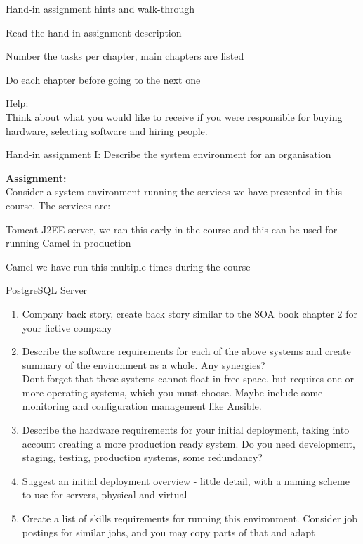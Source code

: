 \documentclass[Screen16to9,17pt]{foils}
\begin{document}


Hand-in assignment hints and walk-through

\begin{list2}
  \item Read the hand-in assignment description
  \item Number the tasks per chapter, main chapters are listed
  \item Do each chapter before going to the next one
\end{list2}

Help:\\
Think about what you would like to receive if you were responsible for buying hardware, selecting software and hiring people.



Hand-in assignment I: Describe the system environment for an organisation

{\bf Assignment:}\\
Consider a system environment running the services we have presented in this course. The services are:

\begin{list2}
\item Tomcat J2EE server, we ran this early in the course and this can be used for running Camel in production
\item Camel we have run this multiple times during the course
\item PostgreSQL Server
\end{list2}


\begin{enumerate}
\item Company back story, create back story similar to the SOA book chapter 2 for your fictive company
\item Describe the software requirements for each of the above systems and create summary of the environment as a whole. Any synergies?\\
Dont forget that these systems cannot float in free space, but requires one or more operating systems, which you must choose. Maybe include some monitoring and configuration management like Ansible.
\item Describe the hardware requirements for your initial deployment, taking into account creating a more production ready system. Do you need development, staging, testing, production systems, some redundancy?
\item Suggest an initial deployment overview - little detail, with a naming scheme to use for servers, physical and virtual
\item Create a list of skills requirements for running this environment. Consider job postings for similar jobs, and you may copy parts of that and adapt
\end{enumerate}
\end{document}
